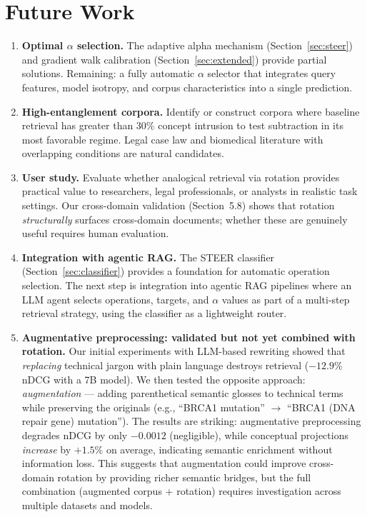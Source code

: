 \documentclass{article}
\begin{document}
\section{Future Work}

\begin{enumerate}
\item \textbf{Optimal $\alpha$ selection.} The adaptive alpha mechanism (Section~\ref{sec:steer}) and gradient walk calibration (Section~\ref{sec:extended}) provide partial solutions. Remaining: a fully automatic $\alpha$ selector that integrates query features, model isotropy, and corpus characteristics into a single prediction.

\item \textbf{High-entanglement corpora.} Identify or construct corpora where baseline retrieval has greater than 30\% concept intrusion to test subtraction in its most favorable regime. Legal case law and biomedical literature with overlapping conditions are natural candidates.

\item \textbf{User study.} Evaluate whether analogical retrieval via rotation provides practical value to researchers, legal professionals, or analysts in realistic task settings. Our cross-domain validation (Section~5.8) shows that rotation \emph{structurally} surfaces cross-domain documents; whether these are genuinely useful requires human evaluation.

\item \textbf{Integration with agentic RAG.} The STEER classifier (Section~\ref{sec:classifier}) provides a foundation for automatic operation selection. The next step is integration into agentic RAG pipelines where an LLM agent selects operations, targets, and $\alpha$ values as part of a multi-step retrieval strategy, using the classifier as a lightweight router.

\item \textbf{Augmentative preprocessing: validated but not yet combined with rotation.} Our initial experiments with LLM-based rewriting showed that \emph{replacing} technical jargon with plain language destroys retrieval ($-12.9\%$ nDCG with a 7B model). We then tested the opposite approach: \emph{augmentation} --- adding parenthetical semantic glosses to technical terms while preserving the originals (e.g., ``BRCA1 mutation'' $\to$ ``BRCA1 (DNA repair gene) mutation''). The results are striking: augmentative preprocessing degrades nDCG by only $-0.0012$ (negligible), while conceptual projections \emph{increase} by $+1.5\%$ on average, indicating semantic enrichment without information loss. This suggests that augmentation could improve cross-domain rotation by providing richer semantic bridges, but the full combination (augmented corpus + rotation) requires investigation across multiple datasets and models.


\end{enumerate}
\end{document}
